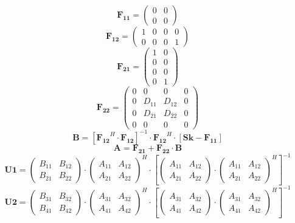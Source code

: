 \documentclass[10pt]{article} \usepackage{amsmath} \usepackage{bbold}
\begin{document}
\[ \mathbf{F_{11}} = \left(\begin{smallmatrix} 0 & 0 \\ 0 & 0
\end{smallmatrix}\right) \]
\[ \mathbf{F_{12}} = \left(\begin{smallmatrix} 1 & 0 & 0 & 0 \\ 0 & 0
& 0 & 1 \end{smallmatrix}\right) \]
\[ \mathbf{F_{21}} = \left(\begin{smallmatrix} 1 & 0 \\ 0 & 0 \\ 0 & 0
\\ 0 & 1 \end{smallmatrix}\right) \]
\[ \mathbf{F_{22}} = \left(\begin{smallmatrix} 0 & 0 & 0 & 0 \\ 0 &
D_{11} & D_{12} & 0 \\ 0 & D_{21} & D_{22} & 0 \\ 0 & 0 & 0 & 0
\end{smallmatrix}\right) \]
\[ \mathbf{B}=\left[ \mathbf{F_{12}}^H \cdot
\mathbf{F_{12}}\right]^{-1} \cdot\mathbf{F_{12}}^H \cdot\left[
\mathbf{Sk} - \mathbf{F_{11}} \right]  \]
\[ \mathbf{A}=\mathbf{F_{21}}+ \mathbf{F_{22}}\cdot\mathbf{B} \]
\[ \mathbf{U1}= \left(\begin{smallmatrix} B_{11} & B_{12} \\ B_{21} &
B_{22} \end{smallmatrix}\right)\cdot \left(\begin{smallmatrix} A_{11}
& A_{12} \\ A_{21} & A_{22} \end{smallmatrix}\right)^H \cdot \left[
\left(\begin{smallmatrix} A_{11} & A_{12} \\ A_{21} & A_{22}
\end{smallmatrix}\right)\cdot\left(\begin{smallmatrix} A_{11} & A_{12}
\\ A_{21} & A_{22} \end{smallmatrix}\right)^H \right]^{-1} \]
\[ \mathbf{U2}= \left(\begin{smallmatrix} B_{31} & B_{32} \\ B_{41} &
B_{42} \end{smallmatrix}\right)\cdot \left(\begin{smallmatrix} A_{31}
& A_{32} \\ A_{41} & A_{42} \end{smallmatrix}\right)^H \cdot \left[
\left(\begin{smallmatrix} A_{31} & A_{32} \\ A_{41} & A_{42}
\end{smallmatrix}\right)\cdot\left(\begin{smallmatrix} A_{31} & A_{32}
\\ A_{41} & A_{42} \end{smallmatrix}\right)^H \right]^{-1} \]
\end{document}

